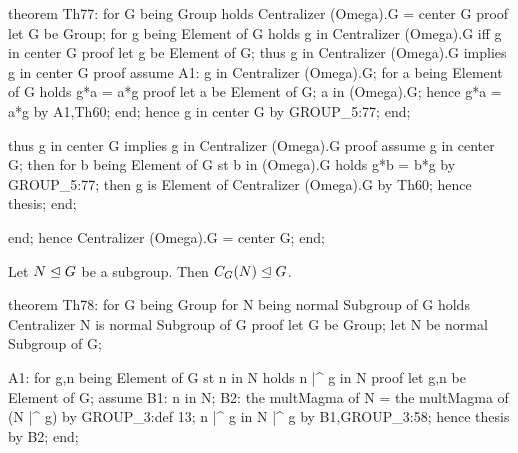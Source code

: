 \nwenddocs{}\endmoddef\nwstartdeflinemarkup{}\nwenddeflinemarkup
theorem Th77:
  for G being Group
  holds Centralizer (Omega).G = center G
proof
  let G be Group;
  for g being Element of G holds g in Centralizer (Omega).G iff g in center G
  proof
    let g be Element of G;
    thus g in Centralizer (Omega).G implies g in center G
    proof
      assume A1: g in Centralizer (Omega).G;
      for a being Element of G holds g*a = a*g
      proof
        let a be Element of G;
        a in (Omega).G;
        hence g*a = a*g by A1,Th60;
      end;
      hence g in center G by GROUP_5:77;
    end;

    thus g in center G implies g in Centralizer (Omega).G
    proof
      assume g in center G;
      then for b being Element of G st b in (Omega).G holds g*b = b*g
      by GROUP_5:77;
      then g is Element of Centralizer (Omega).G by Th60;
      hence thesis;
    end;

  end;
  hence Centralizer (Omega).G = center G;
end;
\eatline
{}\nwendcode{}\nwdocspar
\begin{theorem}
Let $N\trianglelefteq G$ be a subgroup. Then $C_{G}(N)\trianglelefteq G$.
\end{theorem}

\nwenddocs{}\endmoddef\nwstartdeflinemarkup{}\nwenddeflinemarkup
theorem Th78:
  for G being Group
  for N being normal Subgroup of G
  holds Centralizer N is normal Subgroup of G
proof
  let G be Group;
  let N be normal Subgroup of G;

  A1: for g,n being Element of G st n in N holds n |^ g in N
  proof
    let g,n be Element of G;
    assume B1: n in N;
    B2: the multMagma of N = the multMagma of (N |^ g) by GROUP_3:def 13;
    n |^ g in N |^ g by B1,GROUP_3:58;
    hence thesis by B2;
  end;

